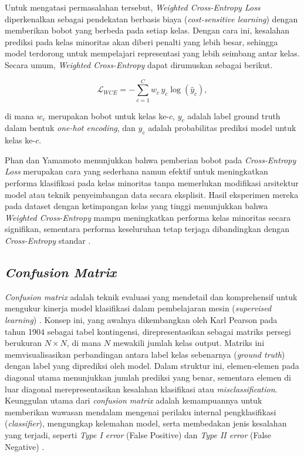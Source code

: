 Untuk mengatasi permasalahan tersebut, \textit{Weighted Cross-Entropy Loss} diperkenalkan sebagai pendekatan berbasis biaya (\textit{cost-sensitive learning}) dengan memberikan bobot yang berbeda pada setiap kelas. Dengan cara ini, kesalahan prediksi pada kelas minoritas akan diberi penalti yang lebih besar, sehingga model terdorong untuk mempelajari representasi yang lebih seimbang antar kelas. Secara umum, \textit{Weighted Cross-Entropy} dapat dirumuskan sebagai berikut.

\begin{equation}
\mathcal{L}_{WCE} = - \sum_{c=1}^{C} w_c \, y_c \log(\hat{y}_c),
\end{equation}
\vspace{1em}

di mana $w_c$ merupakan bobot untuk kelas ke-$c$, $y_c$ adalah label ground truth dalam bentuk \textit{one-hot encoding}, dan $\hat{y}_c$ adalah probabilitas prediksi model untuk kelas ke-$c$.

Phan dan Yamamoto menunjukkan bahwa pemberian bobot pada \textit{Cross-Entropy Loss} merupakan cara yang sederhana namun efektif untuk meningkatkan performa klasifikasi pada kelas minoritas tanpa memerlukan modifikasi arsitektur model atau teknik penyeimbangan data secara eksplisit. Hasil eksperimen mereka pada dataset dengan ketimpangan kelas yang tinggi menunjukkan bahwa \textit{Weighted Cross-Entropy} mampu meningkatkan performa kelas minoritas secara signifikan, sementara performa keseluruhan tetap terjaga dibandingkan dengan \textit{Cross-Entropy} standar \cite{resolving_phan_2020}.

\subsection{\textit{Confusion Matrix}} \label{II.Teori1}
\textit{Confusion matrix} adalah teknik evaluasi yang mendetail dan komprehensif untuk mengukur kinerja model klasifikasi dalam pembelajaran mesin (\emph{supervised learning}) \cite{sathyanarayanan2024confusion}. Konsep ini, yang awalnya dikembangkan oleh Karl Pearson pada tahun 1904 sebagai tabel kontingensi, direpresentasikan sebagai matriks persegi berukuran $N \times N$, di mana $N$ mewakili jumlah kelas output. Matriks ini memvisualisasikan perbandingan antara label kelas sebenarnya (\emph{ground truth}) dengan label yang diprediksi oleh model. Dalam struktur ini, elemen-elemen pada diagonal utama menunjukkan jumlah prediksi yang benar, sementara elemen di luar diagonal merepresentasikan kesalahan klasifikasi atau \emph{misclassification}. Keunggulan utama dari \emph{confusion matrix} adalah kemampuannya untuk memberikan wawasan mendalam mengenai perilaku internal pengklasifikasi (\emph{classifier}), mengungkap kelemahan model, serta membedakan jenis kesalahan yang terjadi, seperti \emph{Type I error} (False Positive) dan \emph{Type II error} (False Negative) \cite{sathyanarayanan2024confusion}.

